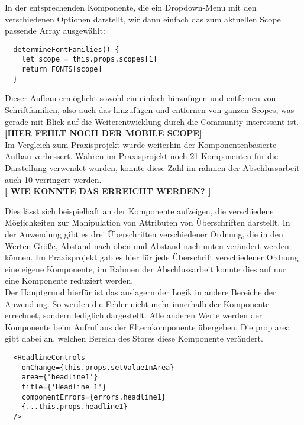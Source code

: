 In der entsprechenden Komponente, die ein Dropdown-Menu mit den verschiedenen Optionen darstellt, wir dann einfach das zum aktuellen Scope passende Array ausgewählt:

\begin{lstlisting}
  determineFontFamilies() {
    let scope = this.props.scopes[1]
    return FONTS[scope]
  }
\end{lstlisting}

Dieser Aufbau ermöglicht sowohl ein einfach hinzufügen und entfernen von Schriftfamilien, also auch das hinzufügen und entfernen von ganzen Scopes, was gerade mit Blick auf die Weiterentwicklung durch die Community interessant ist.\\

\textbf{[HIER FEHLT NOCH DER MOBILE SCOPE]}\\

Im Vergleich zum Praxisprojekt wurde weiterhin der Komponentenbasierte Aufbau verbessert. Währen im Praxisprojekt noch 21 Komponenten für die Darstellung verwendet wurden, konnte diese Zahl im rahmen der Abschlussarbeit auch 10 verringert werden.\\
\textbf{[ WIE KONNTE DAS ERREICHT WERDEN? ]}

Dies lässt sich beispielhaft an der Komponente aufzeigen, die verschiedene Möglichkeiten zur Manipulation von Attributen von Überschriften darstellt. In der Anwendung gibt es drei Überschriften verschiedener Ordnung, die in den Werten Größe,  Abstand nach oben und Abstand  nach unten verändert werden können. Im Praxisprojekt gab es hier für jede Überschrift verschiedener Ordnung eine eigene Komponente, im Rahmen der Abschlussarbeit konnte dies auf nur eine Komponente reduziert werden.\\
Der Hauptgrund hierfür ist das auslagern der Logik in andere Bereiche der Anwendung. So werden die Fehler nicht mehr innerhalb der Komponente errechnet, sondern lediglich dargestellt. Alle anderen Werte werden der Komponente beim Aufruf aus der Elternkomponente übergeben. Die prop area gibt dabei an, welchen Bereich des Stores diese Komponente verändert.

\begin{lstlisting}
  <HeadlineControls
  	onChange={this.props.setValueInArea}
  	area={'headline1'}
  	title={'Headline 1'}
  	componentErrors={errors.headline1}
  	{...this.props.headline1}
  />
\end{lstlisting}

